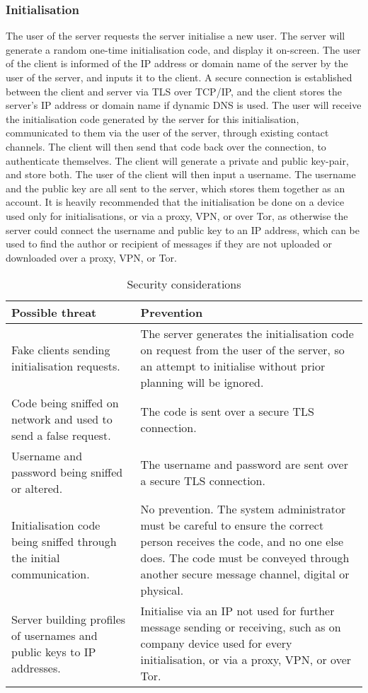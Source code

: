 \documentclass{article}
\begin{document}
\subsubsection{Initialisation}
The user of the server requests the server initialise a new user. The server will generate a random one-time initialisation code, and display it on-screen. The user of the client is informed of the IP address or domain name of the server by the user of the server, and inputs it to the client. A secure connection is established between the client and server via TLS over TCP/IP, and the client stores the server's IP address or domain name if dynamic DNS is used. The user will receive the initialisation code generated by the server for this initialisation, communicated to them via the user of the server, through existing contact channels. The client will then send that code back over the connection, to authenticate themselves. The client will generate a private and public key-pair, and store both. The user of the client will then input a username. The username and the public key are all sent to the server, which stores them together as an account. It is heavily recommended that the initialisation be done on a device used only for initialisations, or via a proxy, VPN, or over Tor, as otherwise the server could connect the username and public key to an IP address, which can be used to find the author or recipient of messages if they are not uploaded or downloaded over a proxy, VPN, or Tor.
\begin{table}[H]
    \centering
    \caption{Security considerations}
    \vspace{0.2cm}
    \begin{tabular}{p{}p{}}
    \toprule
    \textbf{Possible threat} & \textbf{Prevention}\\
    \midrule
    Fake clients sending initialisation requests. & The server generates the initialisation code on request from the user of the server, so an attempt to initialise without prior planning will be ignored.\\
    \midrule
    Code being sniffed on network and used to send a false request. & The code is sent over a secure TLS connection.\\
    \midrule
    Username and password being sniffed or altered. & The username and password are sent over a secure TLS connection.\\
    \midrule
    Initialisation code being sniffed through the initial communication. & No prevention. The system administrator must be careful to ensure the correct person receives the code, and no one else does. The code must be conveyed through another secure message channel, digital or physical.\\
    \midrule
    Server building profiles of usernames and public keys to IP addresses. & Initialise via an IP not used for further message sending or receiving, such as on company device used for every initialisation, or via a proxy, VPN, or over Tor.\\
    \bottomrule
    \end{tabular}
    \label{tab:secconsinit}
\end{table}
\end{document}
